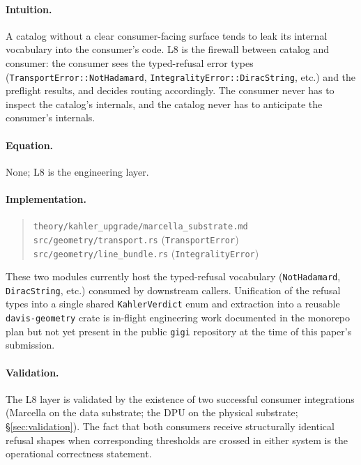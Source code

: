 \documentclass[11pt,letterpaper]{article}
\begin{document}
\paragraph{Intuition.}
A catalog without a clear consumer-facing surface tends to leak its
internal vocabulary into the consumer's code. L8 is the firewall
between catalog and consumer: the consumer sees the typed-refusal
error types (\texttt{TransportError::NotHadamard},
\texttt{IntegralityError::DiracString}, etc.) and the preflight
results, and decides routing accordingly. The consumer never has
to inspect the catalog's internals, and the catalog never has to
anticipate the consumer's internals.

\paragraph{Equation.}
None; L8 is the engineering layer.

\paragraph{Implementation.}
\begin{quote}
\sloppy
\texttt{theory/kahler\_upgrade/marcella\_substrate.md} \\
\texttt{src/geometry/transport.rs} (\texttt{TransportError}) \\
\texttt{src/geometry/line\_bundle.rs} (\texttt{IntegralityError})
\end{quote}
These two modules currently host the typed-refusal vocabulary
(\texttt{NotHadamard}, \texttt{DiracString}, etc.) consumed by
downstream callers. Unification of the refusal types into a single
shared \texttt{KahlerVerdict} enum and extraction into a reusable
\texttt{davis-geometry} crate is in-flight engineering work
documented in the monorepo plan but not yet present in the public
\texttt{gigi} repository at the time of this paper's submission.

\paragraph{Validation.}
The L8 layer is validated by the existence of two successful
consumer integrations (Marcella on the data substrate; the DPU on
the physical substrate; \S\ref{sec:validation}). The fact that
both consumers receive structurally identical refusal shapes when
corresponding thresholds are crossed in either system is the
operational correctness statement.
\end{document}
